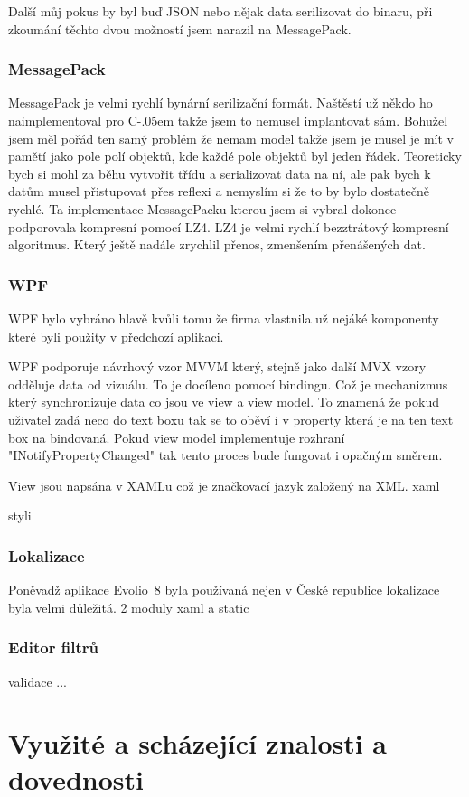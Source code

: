 \documentclass[czech,bachelor,dept460,male,csharp]{diploma}
\newcommand{\EvolioEight}{Evolio~8}
\newcommand{\Csharp}{%
  {\settoheight{\dimen0}{C}C\kern-.05em \resizebox{!}{\dimen0}{\raisebox{\depth}{\#}}}}
\begin{document}
			Další můj pokus by byl buď JSON nebo nějak data serilizovat do binaru, při zkoumání těchto dvou možností jsem narazil na MessagePack. 
		\subsubsection{MessagePack}
			MessagePack\cite{mpSpec} je velmi rychlí bynární serilizační formát. Naštěstí už někdo ho naimplementoval pro {\Csharp} takže jsem to nemusel implantovat sám. Bohužel jsem měl pořád ten samý problém že nemam model takže jsem je musel je mít v pamětí jako pole polí objektů, kde každé pole objektů byl jeden řádek. Teoreticky bych si mohl za běhu vytvořit třídu a serializovat data na ní, ale pak bych k datům musel přistupovat přes reflexi a nemyslím si že to by bylo dostatečně rychlé. Ta implementace MessagePacku\cite{mpImpl} kterou jsem si vybral dokonce podporovala kompresní pomocí LZ4. LZ4\cite{l4z} je velmi rychlí bezztrátový kompresní algoritmus. Který ještě nadále zrychlil přenos, zmenšením přenášených dat.
		\subsubsection{WPF}
			WPF bylo vybráno hlavě kvůli tomu že firma vlastnila už nejáké komponenty které byli použity v předchozí aplikaci.
			
			WPF podporuje návrhový vzor MVVM který, stejně jako další MVX vzory odděluje data od vizuálu. To je docíleno pomocí bindingu. Což je mechanizmus který synchronizuje data co jsou ve view a view model. To znamená že pokud uživatel zadá neco do text boxu tak se to oběví i v property která je na ten text box na bindovaná. Pokud view model implementuje rozhraní "INotifyPropertyChanged" tak tento proces bude fungovat i opačným směrem.
			
			View jsou napsána v XAMLu což je značkovací jazyk založený na XML.
			xaml
			
			
			styli
		\subsubsection{Lokalizace}
			Poněvadž aplikace {\EvolioEight} byla používaná nejen v České republice lokalizace byla velmi důležitá.
			2 moduly xaml a static
		\subsubsection{Editor filtrů}
			validace ... 		
\section{Využité a scházející znalosti a dovednosti}
\end{document}
